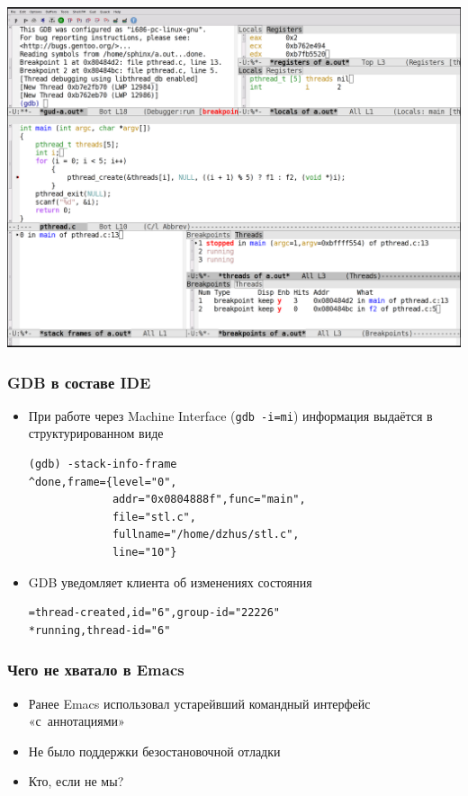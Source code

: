\documentclass[onlymath]{beamer}
\newcommand\code\texttt
\begin{document}
\begin{frame}[plain,c]
  \begin{centering}
    \includegraphics[height=.9\paperheight]{emacs-gdb.png}
  \end{centering}
\end{frame}


\begin{frame}[fragile]
  \frametitle{GDB в составе IDE}
  \begin{itemize}
  \item При работе через Machine Interface (\code{gdb -i=mi})
    информация выдаётся в структурированном виде
\begin{lstlisting}[style=session]
(gdb) -stack-info-frame
^done,frame={level="0",
             addr="0x0804888f",func="main",
             file="stl.c",
             fullname="/home/dzhus/stl.c",
             line="10"}
\end{lstlisting}
  \item GDB уведомляет клиента об изменениях состояния
\begin{lstlisting}[style=session]
=thread-created,id="6",group-id="22226"
*running,thread-id="6"
\end{lstlisting}
  \end{itemize}
\end{frame}

\begin{frame}
  \frametitle{Чего не хватало в Emacs}
  \begin{itemize}
  \item Ранее Emacs использовал устарейвший командный интерфейс
    «с аннотациями»
  \item Не было поддержки безостановочной отладки
  \item Кто, если не мы?
  \end{itemize}
\end{frame}
\end{document}
